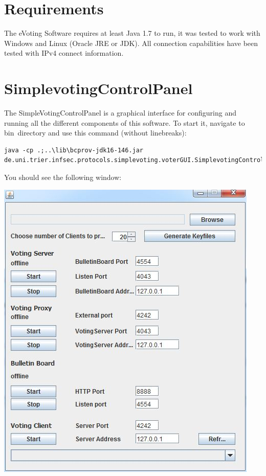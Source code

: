 \documentclass{article}
\begin{document}
\tableofcontents
\newpage

\section{Requirements}
The eVoting Software requires at least Java 1.7 to run, it was tested to work with Windows and Linux (Oracle JRE or JDK). All connection capabilities have been tested with IPv4 connect information.

\section{SimplevotingControlPanel}
The SimpleVotingControlPanel is a graphical interface for configuring and running all the different components of this software. To start it, navigate to bin\ directory and use this command (without linebreaks):
\begin{lstlisting}
java -cp .;..\lib\bcprov-jdk16-146.jar 
de.uni.trier.infsec.protocols.simplevoting.voterGUI.SimplevotingControlPanel
\end{lstlisting}
You should see the following window:\\
\begin{center}
\includegraphics{./controlpanel.jpg}
\end{center}
\end{document}
